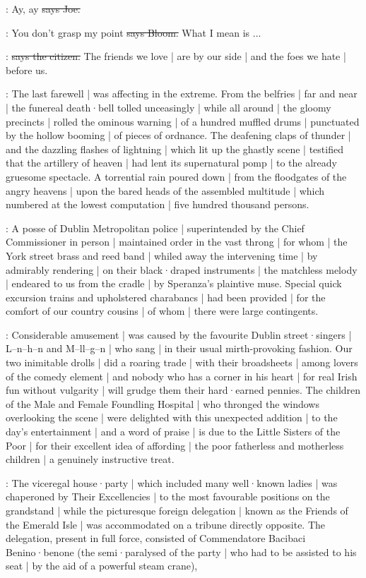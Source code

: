 \joe:
Ay,
ay
\sout{says Joe.}

\Bloom:
You don't grasp my point
\sout{says Bloom.}
What I mean is ...

\citizen:
\sout{says the citizen.}
The friends we love |
are by our side |
and the foes we hate |
before us.

:
The last farewell |
was affecting in the extreme.
From the belfries |
far and near |
the funereal death·bell tolled unceasingly |
while all around |
the gloomy precincts |
rolled the ominous warning |
of a hundred muffled drums |
punctuated by the hollow booming |
of pieces of ordnance.
The deafening claps of thunder |
and the dazzling flashes of lightning |
which lit up the ghastly scene |
testified that the artillery of heaven
 |
had lent its supernatural pomp |
to the already gruesome spectacle.
A torrential rain poured down |
from the floodgates of the angry heavens |
upon the bared heads of the assembled multitude |
which numbered at the lowest computation |
five hundred thousand persons.

:
A posse of Dublin Metropolitan police |
superintended by the Chief Commissioner in person |
maintained order in the vast throng |
for whom |
the York street brass and reed band |
whiled away the intervening time |
by admirably rendering |
on their black·draped instruments |
the matchless melody |
endeared to us from the cradle |
by Speranza's plaintive muse.
Special quick excursion trains and upholstered charabancs |
had been provided
 |
for the comfort of our country cousins |
of whom |
there were large contingents.

:
Considerable amusement |
was caused by the favourite Dublin street·singers |
L–n–h–n and M–ll–g–n |
who sang  |
in their usual mirth-provoking fashion.
Our two inimitable drolls |
did a roaring trade |
with their broadsheets |
among lovers of the comedy element |
and nobody who has a corner in his heart |
for real Irish fun without vulgarity |
will grudge them their hard·earned pennies.
The children of the Male and Female Foundling Hospital |
who thronged the windows overlooking the scene |
were delighted with this unexpected addition |
to the day's entertainment |
and a word of praise |
is due to the Little Sisters of the Poor
 |
for their excellent idea of affording |
the poor fatherless and motherless children |
a genuinely instructive treat.

:
The viceregal house·party |
which included many well·known ladies |
was chaperoned by Their Excellencies |
to the most favourable positions on the grandstand |
while the picturesque foreign delegation |
known as the Friends of the Emerald Isle |
was accommodated on a tribune directly opposite.
The delegation,
present in full force,
consisted of Commendatore Bacibaci Benino·benone
(the semi·paralysed  of the party |
who had to be assisted to his seat |
by the aid of a powerful steam crane),

